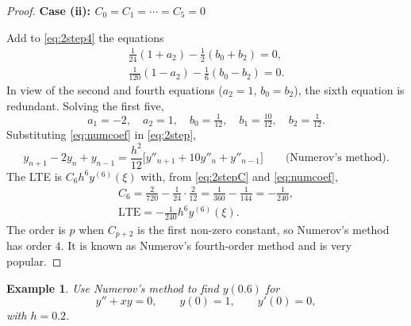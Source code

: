 \documentclass[11pt,a4paper]{article}
\numberwithin{equation}{section}
\theoremstyle{spacedplain}
\theoremstyle{spaceddefinition}
\newtheorem{example}[theorem]{Example}
\theoremstyle{spacedremark}
\newcommand{\step}[1]{\par\addvspace{0.6em}\noindent\textbf{#1}\par\nobreak}
\begin{document}
\begin{proof}
\step{Case (ii): \(C_0=C_1=\cdots=C_5=0\)}
Add to
\eqref{eq:2step4} the equations
\[
\begin{gathered}
  \tfrac1{24}(1+a_2)-\tfrac12(b_0+b_2)=0,
  \\
  \tfrac1{120}(1-a_2)-\tfrac16(b_0-b_2)=0.
\end{gathered}
\]
In view of the second and fourth equations (\(a_2=1\), \(b_0=b_2\)),
the sixth equation is redundant.  Solving the first five,
\begin{equation}\label{eq:numcoef}
  a_1=-2,\quad a_2=1,\quad b_0=\tfrac1{12},\quad
  b_1=\tfrac{10}{12},\quad b_2=\tfrac1{12}.
\end{equation}
Substituting \eqref{eq:numcoef} in \eqref{eq:2step},
\[
  \boxed{y_{n+1}-2y_n+y_{n-1}
  =\frac{h^2}{12}\bigl[y''_{n+1}+10y''_n+y''_{n-1}\bigr]}
  \qquad\text{(Numerov's method).}
\]
The LTE is \(C_6h^6y^{(6)}(\xi)\) with, from \eqref{eq:2stepC} and
\eqref{eq:numcoef},
\[
\begin{gathered}
  C_6=\frac{2}{720}-\frac1{24}\cdot\frac{2}{12}
  =\frac1{360}-\frac1{144}
  =-\frac1{240},
  \\
  \text{LTE}=-\frac1{240}h^6y^{(6)}(\xi).
\end{gathered}
\]
The order is \(p\) when \(C_{p+2}\) is the first non-zero constant, so
Numerov's method has order \(4\).  It is known as Numerov's
fourth-order method and is very popular.
\end{proof}

\begin{example}
Use Numerov's method to find \(y(0.6)\) for
\[
  y''+xy=0,\qquad y(0)=1,\qquad y'(0)=0,
\]
with \(h=0.2\).
\end{example}
\end{document}
